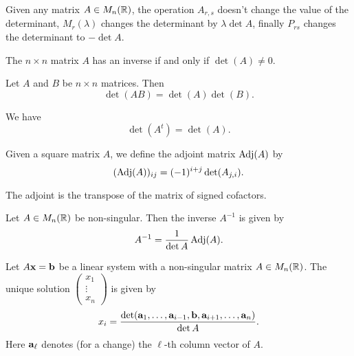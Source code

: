 \documentclass[10pt, a4paper]{article}
\begin{document}
\begin{remark}
    Given any matrix $A \in M_n(\mathbb{R})$,
    the operation $A_{r, s}$ doesn't change the value of the determinant,
    $M_{r}(\lambda)$ changes the determinant by $\lambda\det{A}$,
    finally $P_{rs}$ changes the determinant to $-\det{A}$.
\end{remark}

\begin{theorem}
    The $n \times n$ matrix $A$ has an inverse if and only if $\det(A) \neq 0$.
\end{theorem}

\begin{theorem}
    Let $A$ and $B$ be $n \times n$ matrices.
    Then
    \[
    \det(AB) = \det(A)\det(B).
    \]
\end{theorem}

\begin{theorem}
    We have
    \[
    \det(A ^ t) = \det(A).
    \]
\end{theorem}

\begin{definition}
    Given a square matrix $A$,
    we define the adjoint matrix $\operatorname{Adj}(A)$ by
    \[
    (\operatorname{Adj}(A))_{ij} = (-1) ^ {i + j}\det(A_{j, i}).
    \]
\end{definition}

\begin{remark}
    The adjoint is the transpose of the matrix of signed cofactors.
\end{remark}

\begin{theorem}
    Let $A \in M_n(\mathbb{R})$ be non-singular.
    Then the inverse $A ^ {-1}$ is given by
    \[
    A ^ {-1} = \frac{1}{\det A}\operatorname{Adj}(A).
    \]
\end{theorem}

\begin{theorem}
    Let $A\mathbf{x} = \mathbf{b}$ be a linear system with a non-singular matrix $A \in M_n(\mathbb{R})$.
    The unique solution $\begin{pmatrix}
        x_1 \\ \vdots \\ x_n
    \end{pmatrix}$ is given by
    \[
    x_i = \frac{\det(\mathbf{a}_1, \dotsc, \mathbf{a}_{i - 1}, \mathbf{b}, \mathbf{a}_{i + 1}, \dotsc, \mathbf{a}_n)}{\det A}.
    \]
    Here $\mathbf{a}_\ell$ denotes (for a change) the $\ell$-th column vector of $A$.
\end{theorem}
\end{document}
